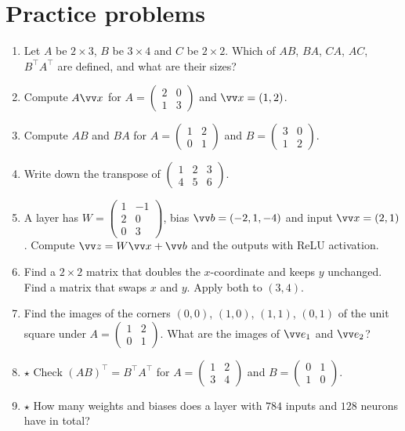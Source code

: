 \section*{Practice problems}
\begin{enumerate}[label=\textbf{\thechapter.\arabic*}]
  \item Let $A$ be $2\times3$, $B$ be $3\times4$ and $C$ be $2\times2$. Which of $AB$, $BA$, $CA$, $AC$, $B^\top A^\top$ are defined, and what are their sizes?
  \item Compute $A\vv x$ for $A=\begin{pmatrix}2&0\\1&3\end{pmatrix}$ and $\vv x=(1,2)$.
  \item Compute $AB$ and $BA$ for $A=\begin{pmatrix}1&2\\0&1\end{pmatrix}$ and $B=\begin{pmatrix}3&0\\1&2\end{pmatrix}$.
  \item Write down the transpose of $\begin{pmatrix}1&2&3\\4&5&6\end{pmatrix}$.
  \item A layer has $W=\begin{pmatrix}1&-1\\2&0\\0&3\end{pmatrix}$, bias $\vv b=(-2,1,-4)$ and input $\vv x=(2,1)$. Compute $\vv z=W\vv x+\vv b$ and the outputs with ReLU activation.
  \item Find a $2\times2$ matrix that doubles the $x$-coordinate and keeps $y$ unchanged. Find a matrix that swaps $x$ and $y$. Apply both to $(3,4)$.
  \item Find the images of the corners $(0,0)$, $(1,0)$, $(1,1)$, $(0,1)$ of the unit square under $A=\begin{pmatrix}1&2\\0&1\end{pmatrix}$. What are the images of $\vv e_1$ and $\vv e_2$?
  \item $\star$ Check $(AB)^\top=B^\top A^\top$ for $A=\begin{pmatrix}1&2\\3&4\end{pmatrix}$ and $B=\begin{pmatrix}0&1\\1&0\end{pmatrix}$.
  \item $\star$ How many weights and biases does a layer with $784$ inputs and $128$ neurons have in total?
\end{enumerate}

